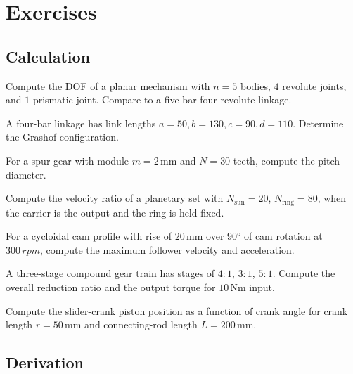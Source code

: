 \section{Exercises}

\subsection*{Calculation}

\begin{exercise}
Compute the DOF of a planar mechanism with $n = 5$ bodies, $4$ revolute joints, and $1$ prismatic joint. Compare to a five-bar four-revolute linkage.
\end{exercise}

\begin{exercise}
A four-bar linkage has link lengths $a = 50, b = 130, c = 90, d = 110$. Determine the Grashof configuration.
\end{exercise}

\begin{exercise}
For a spur gear with module $m = 2\,\si{\milli\meter}$ and $N = 30$ teeth, compute the pitch diameter.
\end{exercise}

\begin{exercise}
Compute the velocity ratio of a planetary set with $N_{\mathrm{sun}} = 20$, $N_{\mathrm{ring}} = 80$, when the carrier is the output and the ring is held fixed.
\end{exercise}

\begin{exercise}
For a cycloidal cam profile with rise of $20\,\si{\milli\meter}$ over $90°$ of cam rotation at $300\,\si{rpm}$, compute the maximum follower velocity and acceleration.
\end{exercise}

\begin{exercise}
A three-stage compound gear train has stages of $4:1$, $3:1$, $5:1$. Compute the overall reduction ratio and the output torque for $10\,\si{\newton\meter}$ input.
\end{exercise}

\begin{exercise}
Compute the slider-crank piston position as a function of crank angle for crank length $r = 50\,\si{\milli\meter}$ and connecting-rod length $L = 200\,\si{\milli\meter}$.
\end{exercise}

\subsection*{Derivation}

